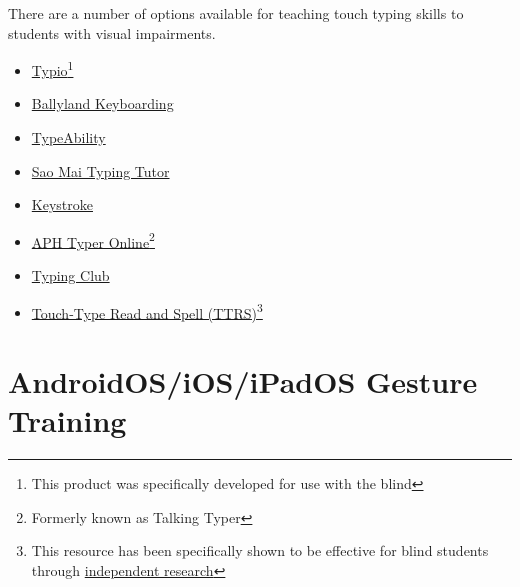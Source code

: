 There are a number of options available for teaching touch typing skills to students with visual impairments. 
\begin{itemize}[leftmargin=*]
	\item \href{https://www.accessibyte.com/typio-online-page/}{Typio}\footnote{\raggedright This product was specifically developed for use with the blind}
	\item \href{https://www.sonokids.org/ballyland-early-learning/ballyland-keyboarding/}{Ballyland Keyboarding}\footnotemark[\value{footnote}]  
	\item \href{https://www.yesaccessible.com/}{TypeAbility}\footnotemark[\value{footnote}]
	\item \href{https://saomaicenter.org/en/smsoft/smtt}{Sao Mai Typing Tutor}\footnotemark[\value{footnote}]
	\item \href{https://www.cfb.state.nm.us/apps/}{Keystroke}\footnotemark[\value{footnote}]
	\item \href{https://typer.aphtech.org/}{APH Typer Online}\footnotemark[\value{footnote}]\fnsep\footnote{\raggedright Formerly known as Talking Typer}
	\item \href{https://www.typingclub.com/}{Typing Club}
	\item \href{https://www.readandspell.com/us/typing-for-the-blind}{Touch-Type Read and Spell (TTRS)}\footnote{\raggedright This resource has been specifically shown to be effective for blind students through \href{https://www.readandspell.com/sites/default/files/Research/greenrich\_report\_-ttrs\_for\_visually\_imparied.pdf}{independent research}} 
\end{itemize}

\pagebreak\hypertarget{appx6}{}\section[AndroidOS/iOS/iPadOS Gesture Training]{AndroidOS/iOS/iPadOS Gesture Training}\label{appx6}

